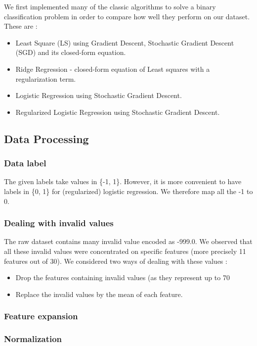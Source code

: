 \documentclass[10pt,conference,compsocconf]{IEEEtran}
\begin{document}
We first implemented many of the classic algorithms to solve a binary classification problem in order to compare how well they perform on our dataset. These are :
\begin{itemize}
    \item Least Square (LS) using Gradient Descent, Stochastic Gradient Descent (SGD) and its closed-form equation.
    \item Ridge Regression - closed-form equation of Least squares with a regularization term.
    \item Logistic Regression using Stochastic Gradient Descent.
    \item Regularized Logistic Regression using Stochastic Gradient Descent.
\end{itemize}

\subsection{Data Processing}

\subsubsection{Data label}
The given labels take values in \{-1, 1\}. However, it is more convenient to have labels in \{0, 1\} for (regularized) logistic regression. We therefore map all the -1 to 0.

\subsubsection{Dealing with invalid values}
The raw dataset contains many invalid value encoded as -999.0. We observed that all these invalid values were concentrated on specific features (more precisely 11 features out of 30). We considered two ways of dealing with these values :
\begin{itemize}
    \item Drop the features containing invalid values (as they represent up to 70%
    \item Replace the invalid values by the mean of each feature.
\end{itemize}

\subsubsection{Feature expansion}


\subsubsection{Normalization}
\end{document}
